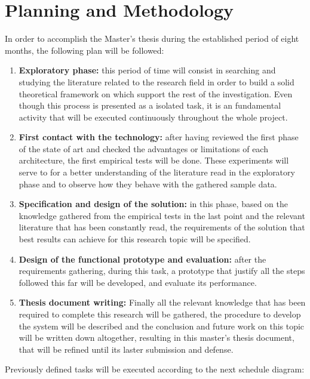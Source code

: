 \chapter{Planning and Methodology}

In order to accomplish the Master's thesis during the established period of eight months, the following plan will be followed:
\begin{enumerate}[label=\textbf{\arabic*}.]
    \item \textbf{Exploratory phase:} this period of time will consist in searching and studying the literature related to the research field in order to build a solid theoretical framework on which support the rest of the investigation. Even though this process is presented as a isolated task, it is an fundamental activity that will be executed continuously throughout the whole project.
    \item \textbf{First contact with the technology:} after having reviewed the first phase of the state of art and checked the advantages or limitations of each architecture, the first empirical tests will be done. These experiments will serve to for a better understanding of the literature read in the exploratory phase and to observe how they behave with the gathered sample data.
    \item \textbf{Specification and design of the solution:} in this phase, based on the knowledge gathered from the empirical tests in the last point and the relevant literature that has been constantly read, the requirements of the solution that best results can achieve for this research topic will be specified.
    \item \textbf{Design of the functional prototype and evaluation:} after the requirements gathering, during this task, a prototype that justify all the steps followed this far will be developed, and evaluate its performance.
    \item \textbf{Thesis document writing:} Finally all the relevant knowledge that has been required to complete this research will be gathered, the procedure to develop the system will be described and the conclusion and future work on this topic will be written down altogether, resulting in this master's thesis document, that will be refined until its laster submission and defense.
\end{enumerate}

Previously defined tasks will be executed according to the next schedule diagram:

